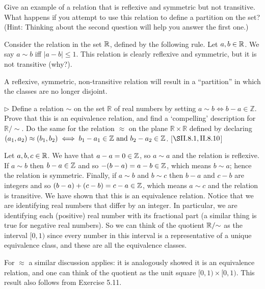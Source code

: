 \begin{exercise}
	Give an example of a relation that is reflexive and symmetric but not transitive. What happens if you attempt to use this relation to define a partition on the set? (Hint: Thinking about the second question will help you answer the first one.)
\end{exercise}
\begin{solution}
	Consider the relation in the set $\mathbb{R}$, defined by the following rule. Let $a,b \in \mathbb{R}$. We say $a\sim b$ iff $|a-b| \leq 1$. This relation is clearly reflexive and symmetric, but it is not transitive (why?).
	
	A reflexive, symmetric, non-transitive relation will result in a ``partition'' in which the classes are no longer disjoint.
\end{solution}
\begin{exercise}
	$\triangleright$ Define a relation $\sim$ on the set $\mathbb{R}$ of real numbers by setting $a \sim b \iff b-a\in \mathbb{Z}$. Prove that this is an equivalence relation, and find a `compelling' description for $\mathbb{R}/{\sim}$. Do the same for the relation $\approx$ on the plane $\mathbb{R} \times \mathbb{R}$ defined by declaring $(a_1,a_2) \approx (b_1,b_2) \iff b_1 - a_1 \in \mathbb{Z}\textnormal{ and }b_2 - a_2\in\mathbb{Z}$. [$\S \RNo{2}.8.1,\RNo{2}.8.10$]
\end{exercise}
\begin{solution}
	Let $a,b,c \in \mathbb{R}$. We have that $a-a = 0 \in \mathbb{Z}$, so $a\sim a$ and the relation is reflexive. If $a\sim b$ then $b-a \in \mathbb{Z}$ and so $-(b-a) = a -b \in \mathbb{Z}$, which means $b\sim a$; hence the relation is symmetric. Finally, if $a\sim b$ and $b \sim c$ then $b-a$ and $c - b$ are integers and so $(b-a) + (c-b) = c-a \in \mathbb{Z}$, which means $a\sim c$ and the relation is transitive. We have shown that this is an equivalence relation. Notice that we are identifying real numbers that differ by an integer. In particular, we are identifying each (positive) real number with its fractional part (a similar thing is true for negative real numbers). So we can think of the quotient $\mathbb{R}/{\sim}$ as the interval $[0,1)$ since every number in this interval is a representative of a unique equivalence class, and these are all the equivalence classes.
	
	For $\approx$ a similar discussion applies: it is analogously showed it is an equivalence relation, and one can think of the quotient as the unit square $[0,1)\times [0,1)$. This result also follows from Exercise 5.11.
\end{solution}